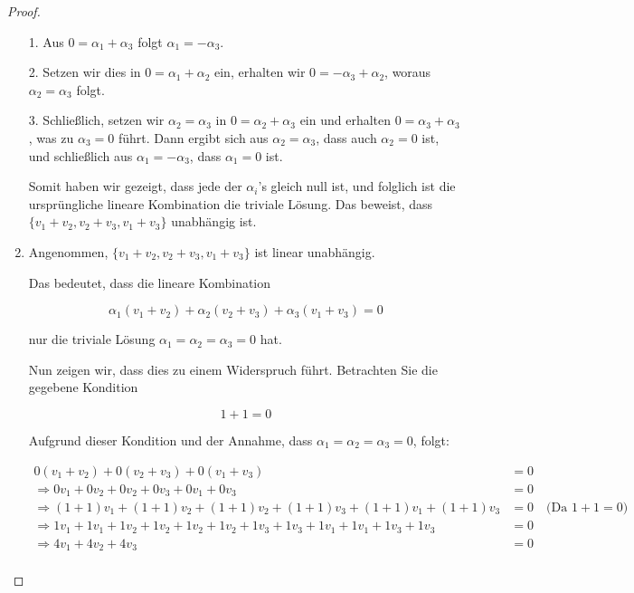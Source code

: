 \documentclass{../problemset}
\begin{document}
\begin{problem}
\begin{proof}
\begin{enumerate}
		      1. Aus \(0 = \alpha_1 + \alpha_3\) folgt \(\alpha_1 = -\alpha_3\).

		      2. Setzen wir dies in \(0 = \alpha_1 + \alpha_2\) ein, erhalten wir \(0 = -\alpha_3 + \alpha_2\), woraus \(\alpha_2 = \alpha_3\) folgt.

		      3. Schließlich, setzen wir \(\alpha_2 = \alpha_3\) in \(0 = \alpha_2 + \alpha_3\) ein und erhalten \(0 = \alpha_3 + \alpha_3\), was zu \(\alpha_3 = 0\) führt. Dann ergibt sich aus \(\alpha_2 = \alpha_3\), dass auch \(\alpha_2 = 0\) ist, und schließlich aus \(\alpha_1 = -\alpha_3\), dass \(\alpha_1 = 0\) ist.

		      Somit haben wir gezeigt, dass jede der \(\alpha_i\)'s gleich null ist, und folglich ist die ursprüngliche lineare Kombination die triviale Lösung. Das beweist, dass \(\{v_1+v_2, v_2+v_3, v_1+v_3\}\) unabhängig ist.
		\item Angenommen, $\{v_1+v_2, v_2+v_3, v_1+v_3\}$ ist linear unabhängig.

		      Das bedeutet, dass die lineare Kombination

		      \[
			      \alpha_1(v_1 + v_2) + \alpha_2(v_2 + v_3) + \alpha_3(v_1 + v_3) = 0
		      \]

		      nur die triviale Lösung $\alpha_1 = \alpha_2 = \alpha_3 = 0$ hat.

		      Nun zeigen wir, dass dies zu einem Widerspruch führt. Betrachten Sie die gegebene Kondition

		      \[
			      1 + 1 = 0
		      \]

		      Aufgrund dieser Kondition und der Annahme, dass $\alpha_1 = \alpha_2 = \alpha_3 = 0$, folgt:

		      \begin{align*}
			      0(v_1 + v_2) + 0(v_2 + v_3) + 0(v_1 + v_3)                                                    & = 0                               \\
			      \Rightarrow 0v_1 + 0v_2 + 0v_2 + 0v_3 + 0v_1 + 0v_3                                           & = 0                               \\
			      \Rightarrow (1+1)v_1 + (1+1)v_2 + (1+1)v_2 + (1+1)v_3 + (1+1)v_1 + (1+1)v_3                   & = 0 \quad \text{(Da $1 + 1 = 0$)} \\
			      \Rightarrow 1v_1 + 1v_1 + 1v_2 + 1v_2 + 1v_2 + 1v_2 + 1v_3 + 1v_3 + 1v_1 + 1v_1 + 1v_3 + 1v_3 & = 0                               \\
			      \Rightarrow 4v_1 + 4v_2 + 4v_3                                                                & = 0                               \\
		      \end{align*}


\end{enumerate}
\end{proof}
\end{problem}
\end{document}
